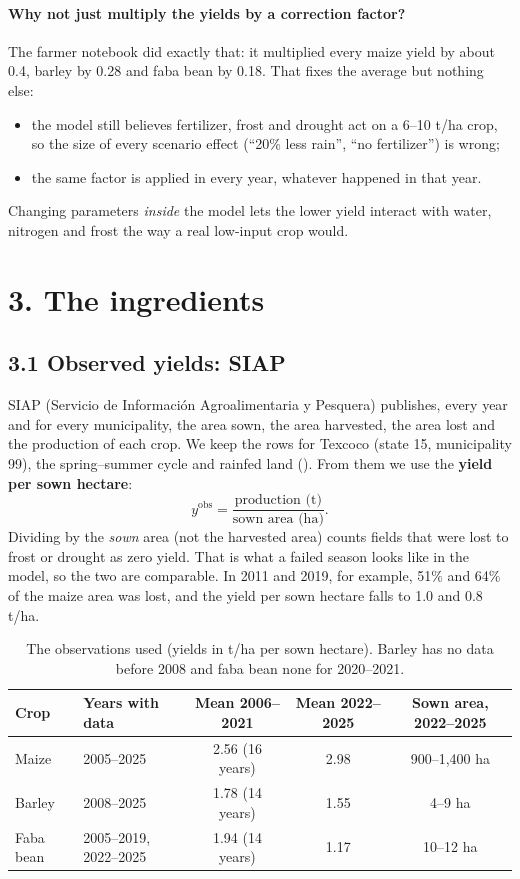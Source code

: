 \documentclass[11pt,a4paper]{article}
\newcommand{\code}[1]{\texttt{\detokenize{#1}}}
\begin{document}
\paragraph{Why not just multiply the yields by a correction factor?}
The farmer notebook did exactly that: it multiplied every maize yield by about 0.4, barley by 0.28 and faba bean by 0.18.
That fixes the average but nothing else:
\begin{itemize}[nosep]
  \item the model still believes fertilizer, frost and drought act on a 6--10 t/ha crop, so the size of every
        scenario effect (``20\% less rain'', ``no fertilizer'') is wrong;
  \item the same factor is applied in every year, whatever happened in that year.
\end{itemize}
Changing parameters \emph{inside} the model lets the lower yield interact with water, nitrogen and frost the way a
real low-input crop would.

\section*{3. The ingredients}

\subsection*{3.1 Observed yields: SIAP}

SIAP (Servicio de Información Agroalimentaria y Pesquera) publishes, every year and for every municipality, the area
sown, the area harvested, the area lost and the production of each crop. We keep the rows for Texcoco (state 15,
municipality 99), the spring--summer cycle and rainfed land (\code{farm_tool.siap_texcoco}). From them we use the
\textbf{yield per sown hectare}:
\begin{equation}
  y^{\mathrm{obs}} = \frac{\text{production (t)}}{\text{sown area (ha)}}.
\end{equation}
Dividing by the \emph{sown} area (not the harvested area) counts fields that were lost to frost or drought as zero
yield. That is what a failed season looks like in the model, so the two are comparable. In 2011 and 2019, for
example, 51\% and 64\% of the maize area was lost, and the yield per sown hectare falls to 1.0 and 0.8 t/ha.

\begin{table}[H]
\centering\small
\begin{tabular}{llccc}
\toprule
Crop & Years with data & Mean 2006--2021 & Mean 2022--2025 & Sown area, 2022--2025 \\
\midrule
Maize & 2005--2025 & 2.56 (16 years) & 2.98 & 900--1,400 ha \\
Barley & 2008--2025 & 1.78 (14 years) & 1.55 & 4--9 ha \\
Faba bean & 2005--2019, 2022--2025 & 1.94 (14 years) & 1.17 & 10--12 ha \\
\bottomrule
\end{tabular}
\caption{The observations used (yields in t/ha per sown hectare). Barley has no data before 2008 and faba bean none
for 2020--2021.}
\end{table}
\end{document}
